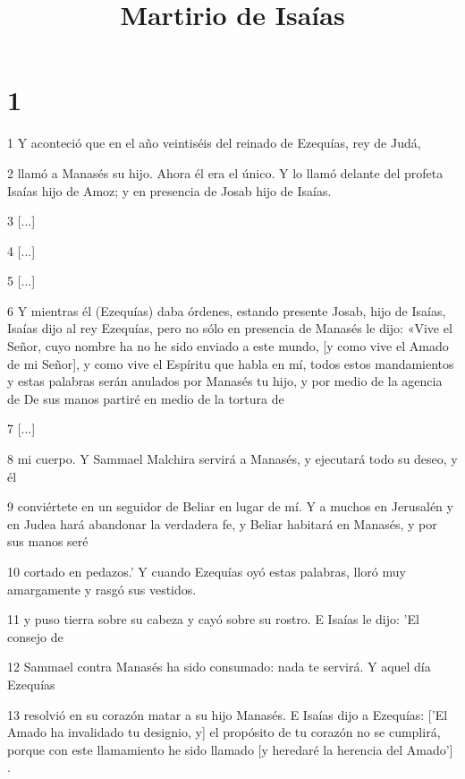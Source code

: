 

\title{Martirio de Isaías}

\chapter{1}

\par 1 Y aconteció que en el año veintiséis del reinado de Ezequías, rey de Judá,

\par 2 llamó a Manasés su hijo. Ahora él era el único. Y lo llamó delante del profeta Isaías hijo de Amoz; y en presencia de Josab hijo de Isaías.

\par 3 [...]

\par 4 [...]

\par 5 [...]

\par 6 Y mientras él (Ezequías) daba órdenes, estando presente Josab, hijo de Isaías, Isaías dijo al rey Ezequías, pero no sólo en presencia de Manasés le dijo: «Vive el Señor, cuyo nombre ha no he sido enviado a este mundo, [y como vive el Amado de mi Señor], y como vive el Espíritu que habla en mí, todos estos mandamientos y estas palabras serán anulados por Manasés tu hijo, y por medio de la agencia de De sus manos partiré en medio de la tortura de

\par 7 [...]

\par 8 mi cuerpo. Y Sammael Malchira servirá a Manasés, y ejecutará todo su deseo, y él

\par 9 conviértete en un seguidor de Beliar en lugar de mí. Y a muchos en Jerusalén y en Judea hará abandonar la verdadera fe, y Beliar habitará en Manasés, y por sus manos seré

\par 10 cortado en pedazos.' Y cuando Ezequías oyó estas palabras, lloró muy amargamente y rasgó sus vestidos.

\par 11 y puso tierra sobre su cabeza y cayó sobre su rostro. E Isaías le dijo: 'El consejo de

\par 12 Sammael contra Manasés ha sido consumado: nada te servirá. Y aquel día Ezequías

\par 13 resolvió en su corazón matar a su hijo Manasés. E Isaías dijo a Ezequías: ['El Amado ha invalidado tu designio, y] el propósito de tu corazón no se cumplirá, porque con este llamamiento he sido llamado [y heredaré la herencia del Amado'] .

